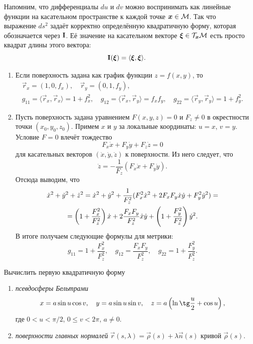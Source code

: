 Напомним, что дифференциалы $du$ и $dv$ можно воспринимать как линейные функции на касательном пространстве к каждой точке $\boldsymbol{x} \in \mathcal{M}$. Так что выражение $ds^2$ задаёт корректно определённую квадратичную форму, которая обозначается через $\boldsymbol{\operatorname{I}}$. Её значение на касательном векторе $\boldsymbol{\xi} \in \mathcal{T}_{\boldsymbol{x}}\mathcal{M}$ есть просто квадрат длины этого вектора:
\[
	\boldsymbol{\operatorname{I}}(\boldsymbol{\xi}) = \langle\boldsymbol{\xi}, \boldsymbol{\xi}\rangle.
\]

\begin{example} \label{example:IFormOnSurfaces}
	\begin{enumerate}[nolistsep, label=(\arabic*)]
		\item Если поверхность задана как график функции $z = f(x, y)$, то
			\begin{gather*}
				\vec{r}_x = (1, 0, f_x),\quad\vec{r}_y = (0, 1, f_y),\\
				g_{11} = \langle\vec{r}_x, \vec{r}_x\rangle = 1 + f_x^2,\quad g_{12} = \langle\vec{r}_x, \vec{r}_y\rangle = f_xf_y,\quad g_{22} = \langle\vec{r}_y, \vec{r}_y\rangle = 1 + f_y^2.
			\end{gather*}
		\item Пусть поверхность задана уравнением $F(x, y, z) = 0$ и $F_z \ne 0$ в окрестности точки $(x_0, y_0, z_0)$. Примем $x$ и $y$ за локальные координаты: $u = x$, $v = y$. Условие $F = 0$ влечёт тождество
			\[
				F_x\dot{x} + F_y\dot{y} + F_z\dot{z} = 0
			\]
			для касательных векторов $(\dot{x}, \dot{y}, \dot{z})$ к поверхности. Из него следует, что
			\[
				\dot{z} = -\frac{1}{F_z}(F_x\dot{x} + F_y\dot{y}).
			\]
			Отсюда выводим, что
			\begin{multline*}
				\dot{x}^2 + \dot{y}^2 + \dot{z}^2 = \dot{x}^2 + \dot{y}^2 + \frac{1}{F_z^2}(F_x^2\dot{x}^2 + 2F_xF_y\dot{x}\dot{y} + F_y^2\dot{y}^2) =\\ = \left(1 + \frac{F_x^2}{F_z^2}\right)\dot{x} + 2\frac{F_xF_y}{F_z^2}\dot{x}\dot{y} + \left(1 + \frac{F_y^2}{F_z^2}\right)\dot{y}^2.
			\end{multline*}
			В итоге получаем следующие формулы для метрики:
			\[
				g_{11} = 1 + \frac{F_x^2}{F_z^2},\quad g_{12} = \frac{F_xF_y}{F_z^2},\quad g_{22} = 1 + \frac{F_y^2}{F_z^2}.
			\]
	\end{enumerate}
\end{example}

\begin{problem} \label{problem:FindG}
	Вычислить первую квадратичную форму
	\begin{enumerate}[nolistsep, label=(\arabic*)]
		\item \textit{псевдосферы Бельтрами}
			\[
				x = a\sin u\cos v,\quad y = a\sin u\sin v,\quad z = a\br{\ln\tg\frac{u}{2} + \cos u},
			\]
			где $0 < u < \pi / 2$, $0 \leqslant v < 2\pi$, $a \ne 0$.
		\item \textit{поверхности главных нормалей} $\vec{r}(s, \lambda) = \vec{\rho}(s) + \lambda\vec{n}(s)$ кривой $\vec{\rho}(s)$.
	\end{enumerate}
\end{problem}

